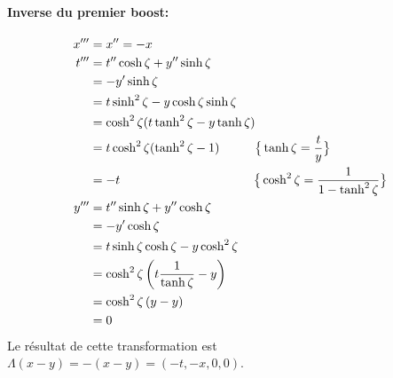 \documentclass{article}
\numberwithin{equation}{section}
\begin{document}
\paragraph{Inverse du premier boost:}
\begin{align*}
        x''' &= x'' = -x \\
        t''' &= t'' \cosh \zeta + y'' \sinh \zeta \\
             &= -y' \sinh \zeta \\
             &= t\sinh^2 \zeta - y\cosh \zeta \sinh \zeta \\
             &= \cosh^2 \zeta (t\tanh^2 \zeta - y \tanh \zeta) \\
             &= t\cosh^2 \zeta (\tanh^2 \zeta - 1) \hspace{1cm} \big\{ \tanh \zeta = \frac{t}{y} \big\}\\
             &= -t \hspace{3.8cm} \big\{\cosh^2\zeta = \frac{1}{1 - \tanh^2\zeta} \big\}\\
        y''' &= t'' \sinh \zeta + y'' \cosh \zeta \\
             &= -y' \cosh \zeta \\
             &= t \sinh \zeta\cosh \zeta - y\cosh^2 \zeta  \\
             &= \cosh^2\zeta \left(t \frac{1}{\tanh \zeta} - y \right)  \\
             &= \cosh^2\zeta \left( y  - y \right)  \\
             &= 0
\end{align*}
Le résultat de cette transformation est $\Lambda(x - y) = -(x - y) = (-t, -x, 0, 0)$.
\end{document}

